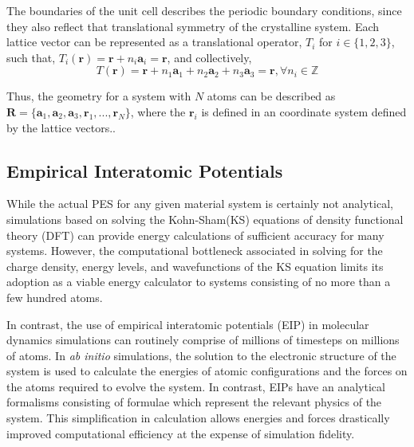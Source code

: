 The boundaries of the unit cell describes the periodic boundary conditions, since they also reflect that translational symmetry of the crystalline system.
Each lattice vector can be represented as a translational operator, $T_i$ for ${i\in\{1,2,3\}}$, such that, $T_i(\bm{r})=\bm{r} + n_i \bm{a}_i = \bm{r}$, and collectively,
\begin{equation}
    T(\bm{r}) = \bm{r}
		    + n_1 \bm{a}_1
		    + n_2 \bm{a}_2
		    + n_3 \bm{a}_3 = \bm{r}, \forall n_i \in \mathbb{Z}
\end{equation}

Thus, the geometry for a system with $N$ atoms can be described as
	$\bm{R} = \{\bm{a}_1,\bm{a}_2,\bm{a}_3,\bm{r}_1,...,\bm{r}_N\}$,
	where the $\bm{r}_i$ is defined in an coordinate system defined by the lattice vectors..

\subsection{Empirical Interatomic Potentials}

While the actual PES for any given material system is certainly not analytical, simulations based on solving the Kohn-Sham(KS) equations of density functional theory (DFT) can provide energy calculations of sufficient accuracy for many systems.  However, the computational bottleneck associated in solving for the charge density, energy levels, and wavefunctions of the KS equation limits its adoption as a viable energy calculator to systems consisting of no more than a few hundred atoms.

In contrast, the use of empirical interatomic potentials (EIP) in molecular dynamics simulations can routinely comprise of millions of timesteps on millions of atoms.  In \emph{ab initio} simulations, the solution to the electronic structure of the system is used to calculate the energies of atomic configurations and the forces on the atoms required to evolve the system. In contrast, EIPs have an analytical formalisms consisting of formulae which represent the relevant physics of the system.  This simplification in calculation allows energies and forces drastically improved computational efficiency at the expense of simulation fidelity.

